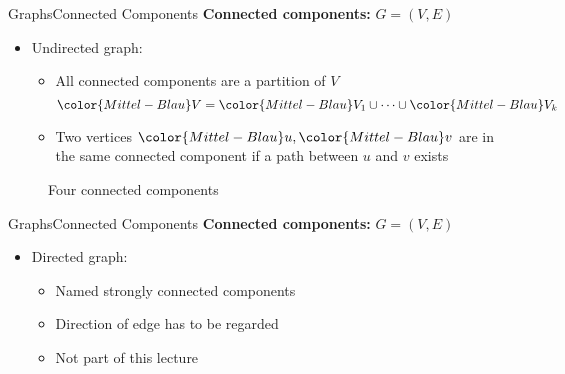 
\begin{frame}{Graphs}{Connected Components}
  \textbf{Connected components:}
  {\color{Mittel-Blau}$G = (V , E)$}
  \begin{itemize}
    \item<2->
      Undirected graph:
      \begin{itemize}
        \item<3->
          All connected components are a partition of {\color{Mittel-Blau}$V$}
          \begin{displaymath}
            {\color{Mittel-Blau}V}
              = {\color{Mittel-Blau}V_1} \cup \dots \cup 
              {\color{Mittel-Blau}V_k}
          \end{displaymath}
        \item<4->
          Two vertices ${\color{Mittel-Blau}u}, {\color{Mittel-Blau}v}$
          are in the same connected component if a path between
          {\color{Mittel-Blau}$u$} and {\color{Mittel-Blau}$v$} exists
      \end{itemize}
  \end{itemize}
  \begin{figure}
    \begin{adjustbox}{width=0.65\linewidth}
      
    \end{adjustbox}
    \caption{Four connected components}
    \label{fig:graph:connected_components}
  \end{figure}
\end{frame}


\begin{frame}{Graphs}{Connected Components}
  \textbf{Connected components:}
  {\color{Mittel-Blau}$G = (V , E)$}
  \begin{itemize}
    \item<2->
      Directed graph:
      \begin{itemize}
        \item<3->
          Named {\color{Mittel-Blau}strongly connected components}
        \item<4->
          Direction of edge has to be regarded
        \item<5->
          Not part of this lecture
      \end{itemize}
  \end{itemize}
\end{frame}


